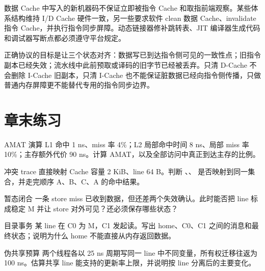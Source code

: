 数据 Cache 中写入的新机器码不保证立即被指令 Cache 和取指前端观察。某些体系结构维持 I/D Cache 硬件一致，另一些要求软件 clean 数据 Cache、invalidate 指令 Cache，并执行指令同步屏障。动态链接器修补跳转表、JIT 编译器生成代码和调试器写断点都必须遵守平台规定。

正确协议的目标是让三个状态对齐：数据写已到达指令侧可见的一致性点；旧指令副本已经失效；流水线中此前预取或译码的旧字节已经被丢弃。只清 D-Cache 不会删除 I-Cache 旧副本，只清 I-Cache 也不能保证脏数据已经向指令侧传播，只做普通内存屏障更不能替代专用的指令同步边界。

\section*{章末练习}

\begin{chapterexercise}{AMAT 演算}
L1 命中 1 ns、miss 率 4\%；L2 局部命中时间 8 ns、局部 miss 率 10\%；主存额外代价 90 ns。计算 AMAT，以及全部访问中真正到达主存的比例。
\end{chapterexercise}

\begin{chapterexercise}{冲突 trace}
直接映射 Cache 容量 2 KiB、line 64 B。判断 、、 是否映射到同一集合，并走完顺序 A、B、C、A 的命中结果。
\end{chapterexercise}

\begin{chapterexercise}{暂态闭合}
一条 store miss 已收到数据，但还差两个失效确认。此时能否把 line 标成稳定 M 并让 store 对外可见？还必须保存哪些状态？
\end{chapterexercise}

\begin{chapterexercise}{目录事务}
某 line 在 C0 为 M，C1 发起读。写出 home、C0、C1 之间的消息和最终状态；说明为什么 home 不能直接从内存返回数据。
\end{chapterexercise}

\begin{chapterexercise}{伪共享预算}
两个线程各以 25 ns 周期写同一 line 中不同变量，所有权迁移往返为 100 ns。估算共享 line 能支持的更新率上限，并说明按 line 分离后的主要变化。
\end{chapterexercise}

